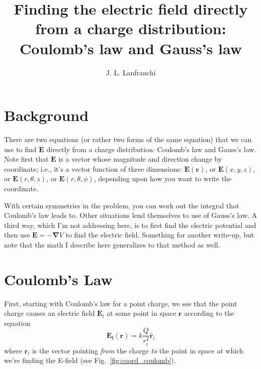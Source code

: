 \documentclass[10pt,letterpaper,twoside]{article}
\author{J. L. Lanfranchi}
\title{Finding the electric field directly from a charge distribution:\\
Coulomb's law and Gauss's law}
\begin{document}
 
\twocolumn
\maketitle
\section{Background}
There are two equations (or rather two forms of the same equation) that we can use to find $\bm E$ directly from a charge distribution: Coulomb's law and Gauss's law.
Note first that $\bm E$ is a vector whose magnitude and direction change by coordinate; i.e., it's a vector function of three dimensions: $\bm E(\bm r)$, or $\bm E(x,y,z)$, or $\bm E(r,\theta,z)$, or $\bm E(r,\theta,\phi)$, depending upon how you want to write the coordinate.

With certain symmetries in the problem, you can work out the integral that Coulomb's law leads to. Other situations lend themselves to use of Gauss's law.
A third way, which I'm not addressing here, is to first find the electric potential and then use $\bm E=-\bm\nabla V$ to find the electric field.
Something for another write-up, but note that the math I describe here generalizes to that method as well.

\section{Coulomb's Law}
First, starting with Coulomb's law for a point charge, we see that the point charge causes an electric field $\bm E_i$ at some point in space $\bm r$ according to the equation
\begin{equation}
  \bm{E_i(r)} = k\frac{Q}{r_i^2}\bm{\hat r}_i \label{eqn:coulomb0}
\end{equation}
where $\bm{r}_i$ is the vector pointing \textit{from} the charge \textit{to} the point in space at which we're finding the E-field (see Fig.~\ref{fig:coord_coulomb}).
\end{document}
